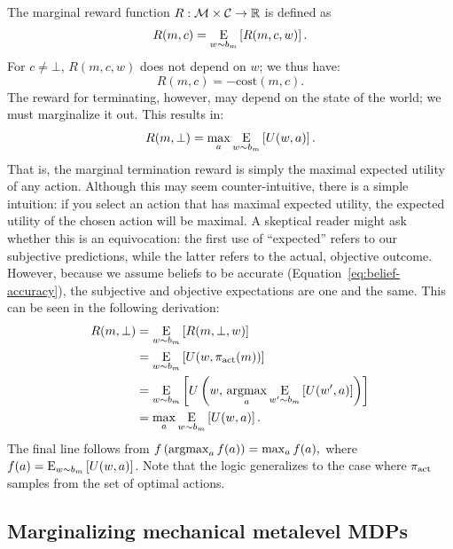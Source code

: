The marginal reward function $R: \M \times \C \rightarrow \R$ is defined as
%
\begin{equation}
R(m, c) = \expectunder{R(m, c, w)}{w \sim b_m}.
\end{equation}
%
For $c \neq \bot$, $R(m, c, w)$ does not depend on $w$; we thus have:
%
\begin{equation}
  R(m, c) = -\text{cost}(m, c).
\end{equation}
The reward for terminating, however, may depend on the state of the world; we must marginalize it out. This results in:
%
\begin{equation}\label{eq:marginal-term}
  R(m, \bot) = \max_a \expectunder{U(w, a)}{w \sim b_m}.
\end{equation}
%
That is, the marginal termination reward is simply the maximal expected utility of any action. Although this may seem counter-intuitive, there is a simple intuition: if you select an action that has maximal expected utility, the expected utility of the chosen action will be maximal. A skeptical reader might ask whether this is an equivocation: the first use of ``expected'' refers to our subjective predictions, while the latter refers to the actual, objective outcome. However, because we assume beliefs to be accurate (Equation~\ref{eq:belief-accuracy}), the subjective and objective expectations are one and the same. This can be seen in the following derivation:
\begin{equation}\label{eq:Rbot-derivation}
\begin{aligned}
R(m, \bot)
&= \expectunder{R(m, \bot, w)}{w \sim b_m} \\
&= \expectunder{U(w, \pi\act(m))}{w \sim b_m} \\
&= \expectunder{U\left(w,\, \argmax_a \expectunder{U(w', a)}{w' \sim b_m}\right)}{w \sim b_m} \\
&= \max_a \expectunder{U(w, a)}{w \sim b_m}
.
\end{aligned}
\end{equation}
%
The final line follows from
%
\begin{math}
  f\left(\argmax_a f(a)\right) = \max_a f(a),
\end{math}
%
where $f(a) = \expectunder{U(w, a)}{w \sim b_m}$. Note that the logic generalizes to the case where $\pi\act$ samples from the set of optimal actions.

\subsection{Marginalizing mechanical metalevel MDPs}\label{sec:marginal-mechanical}

